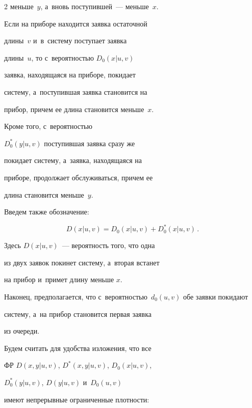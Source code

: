\begin{multicols}{2}
меньше~$y$, а~вновь поступившей~--- меньше~$x$.





Если на приборе находится заявка остаточной


длины~$v$ и~в~систему поступает заявка


длины~$u$, то с~вероятностью $D_0(x|u,v)$


заявка, находящаяся на приборе, покидает


систему, а~поступившая заявка становится на


прибор, причем ее длина становится меньше~$x$.


Кроме того, с~вероятностью


$D_0^*(y|u,v)$ поступившая заявка сразу же


покидает систему, а~заявка, находящаяся на


приборе, продолжает обслуживаться, причем ее


длина становится меньше~$y$.


Введем также обозначение:


\begin{equation*}




D(x|u,v) = D_0(x|u,v) + D_0^*(x|u,v)\,.


\end{equation*}


Здесь $D(x|u,v)$~--- вероятность того, что одна


из двух заявок покинет систему, а~вторая встанет


на прибор и~примет длину меньше $x$.








Наконец, предполагается, что с~вероят\-ностью~$d_0(u,v)$ обе заявки покидают


систему, а~на прибор становится первая заявка


из очереди.





Будем считать для удобства изложения, что все


ФР $D(x,y|u,v)$, $D^*(x,y|u,v)$, $D_0(x|u,v)$,


$D_0^*(y|u,v)$, $D(y|u,v)$ и~$D_0(u,v)$


имеют непрерывные ограниченные плотности:


\begin{gather*}



\end{gather*}
\end{multicols}

